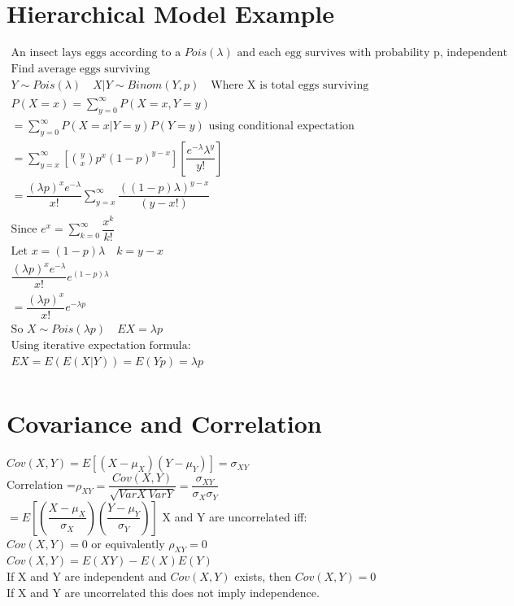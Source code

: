 \documentclass[openany]{book}
\begin{document}
\begin{flushleft}
\section{Hierarchical Model Example}
\begin{multline*}
\text{An insect lays eggs according to a } Pois(\lambda) \text{ and each egg survives with probability p, independent}\\
\text{Find average eggs surviving}\\
Y\sim Pois(\lambda) \quad X|Y \sim Binom(Y,p) \quad \text{Where X is total eggs surviving}\\
P(X=x)=\sum_{y=0}^{\infty}P(X=x,Y=y)\\
=\sum_{y=0}^{\infty}P(X=x|Y=y)P(Y=y) \text{ using conditional expectation}\\
=\sum_{y=x}^{\infty}\left[{y \choose x} p^x(1-p)^{y-x} \right] \left[\dfrac{e^{-\lambda }\lambda^y}{y!} \right]\\
=\dfrac{(\lambda p)^x e^{-\lambda}}{x!}\sum_{y=x}^{\infty}\dfrac{((1-p)\lambda)^{y-x}}{(y-x!)}\\
\text{Since } e^x=\sum_{k=0}^{\infty}\dfrac{x^k}{k!}\\
\text{Let } x=(1-p)\lambda \quad k=y-x\\
\dfrac{(\lambda p)^x e^{-\lambda}}{x!}e^{(1-p)\lambda}\\
=\dfrac{(\lambda p)^x}{x!}e^{-\lambda p}\\
\text{So } X\sim Pois(\lambda p) \quad EX=\lambda p\\
\text{Using iterative expectation formula:}\\
EX=E(E(X|Y))=E(Yp)=\lambda p\\
\end{multline*}
\section{Covariance and Correlation}
$Cov(X,Y)=E[(X-\mu_X)(Y-\mu_Y)]=\sigma_{XY}$\\
Correlation =$\rho_{XY}=\dfrac{Cov(X,Y)}{\sqrt{VarX \ VarY}}=\dfrac{\sigma_{XY}}{\sigma_X \sigma_Y}$\\
$=E\left[ \left( \dfrac{X-\mu_X}{\sigma_X} \right) \left( \dfrac{Y-\mu_Y}{\sigma_Y} \right) \right]$\medbreak
X and Y are uncorrelated iff:\\
$Cov(X,Y)=0$ or equivalently $\rho_{XY}=0$\\
$Cov(X,Y)=E(XY)-E(X)E(Y)$\\
If X and Y are independent and $Cov(X,Y)$ exists, then $Cov(X,Y)=0$\\
If X and Y are uncorrelated this does not imply independence.\\

\end{flushleft}
\end{document}
